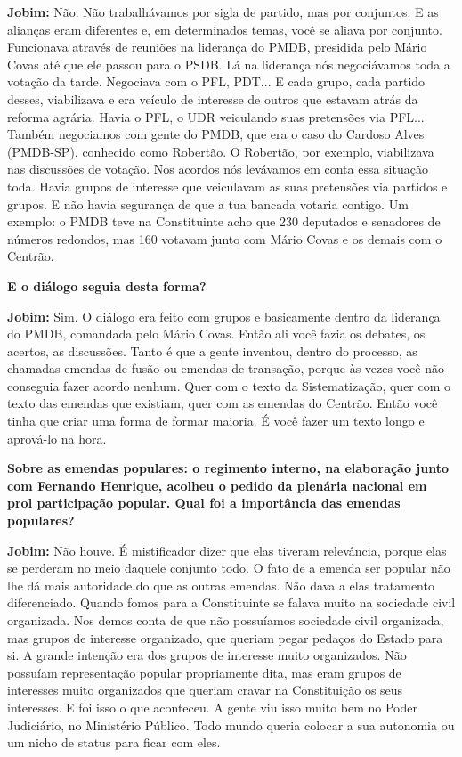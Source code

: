\textbf{Jobim:} Não. Não trabalhávamos por sigla de partido, mas por
conjuntos. E as alianças eram diferentes e, em determinados temas, você
se aliava por conjunto. Funcionava através de reuniões na liderança do
PMDB, presidida pelo Mário Covas até que ele passou para o PSDB. Lá na
liderança nós negociávamos toda a votação da tarde. Negociava com o PFL,
PDT... E cada grupo, cada partido desses, viabilizava e era veículo de
interesse de outros que estavam atrás da reforma agrária. Havia o PFL, o
UDR veiculando suas pretensões via PFL... Também negociamos com gente do
PMDB, que era o caso do Cardoso Alves (PMDB-SP), conhecido como
Robertão. O Robertão, por exemplo, viabilizava nas discussões de
votação. Nos acordos nós levávamos em conta essa situação toda. Havia
grupos de interesse que veiculavam as suas pretensões via partidos e
grupos. E não havia segurança de que a tua bancada votaria contigo. Um
exemplo: o PMDB teve na Constituinte acho que 230 deputados e senadores
de números redondos, mas 160 votavam junto com Mário Covas e os demais
com o Centrão.

\textbf{E o diálogo seguia desta forma?}

\textbf{Jobim:} Sim. O diálogo era feito com grupos e basicamente dentro
da liderança do PMDB, comandada pelo Mário Covas. Então ali você fazia
os debates, os acertos, as discussões. Tanto é que a gente inventou,
dentro do processo, as chamadas emendas de fusão ou emendas de
transação, porque às vezes você não conseguia fazer acordo nenhum. Quer
com o texto da Sistematização, quer com o texto das emendas que
existiam, quer com as emendas do Centrão. Então você tinha que criar uma
forma de formar maioria. É você fazer um texto longo e aprová-lo na
hora.

\textbf{Sobre as emendas populares: o regimento interno, na elaboração
junto com Fernando Henrique, acolheu o pedido da plenária nacional em
prol participação popular. Qual foi a importância das emendas
populares?}

\textbf{Jobim:} Não houve. É mistificador dizer que elas tiveram
relevância, porque elas se perderam no meio daquele conjunto todo. O
fato de a emenda ser popular não lhe dá mais autoridade do que as outras
emendas. Não dava a elas tratamento diferenciado. Quando fomos para a
Constituinte se falava muito na sociedade civil organizada. Nos demos
conta de que não possuíamos sociedade civil organizada, mas grupos de
interesse organizado, que queriam pegar pedaços do Estado para si. A
grande intenção era dos grupos de interesse muito organizados. Não
possuíam representação popular propriamente dita, mas eram grupos de
interesses muito organizados que queriam cravar na Constituição os seus
interesses. E foi isso o que aconteceu. A gente viu isso muito bem no
Poder Judiciário, no Ministério Público. Todo mundo queria colocar a sua
autonomia ou um nicho de status para ficar com eles.

